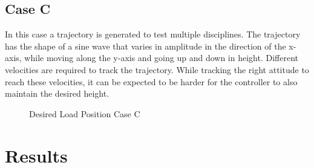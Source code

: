 \subsection{Case C}
In this case a trajectory is generated to test multiple disciplines. 
The trajectory has the shape of a sine wave that varies in amplitude in the direction of the x-axis, while moving along the y-axis and going up and down in height.
Different velocities are required to track the trajectory. While tracking the right  attitude to reach these velocities, it can be expected to be harder for the controller to also maintain the desired height. 

\begin{figure}[h!]
	\centering
	\caption{Desired Load Position Case C\label{fig:set.caseC}}
\end{figure}		


\section{Results}\label{set:set.res}
